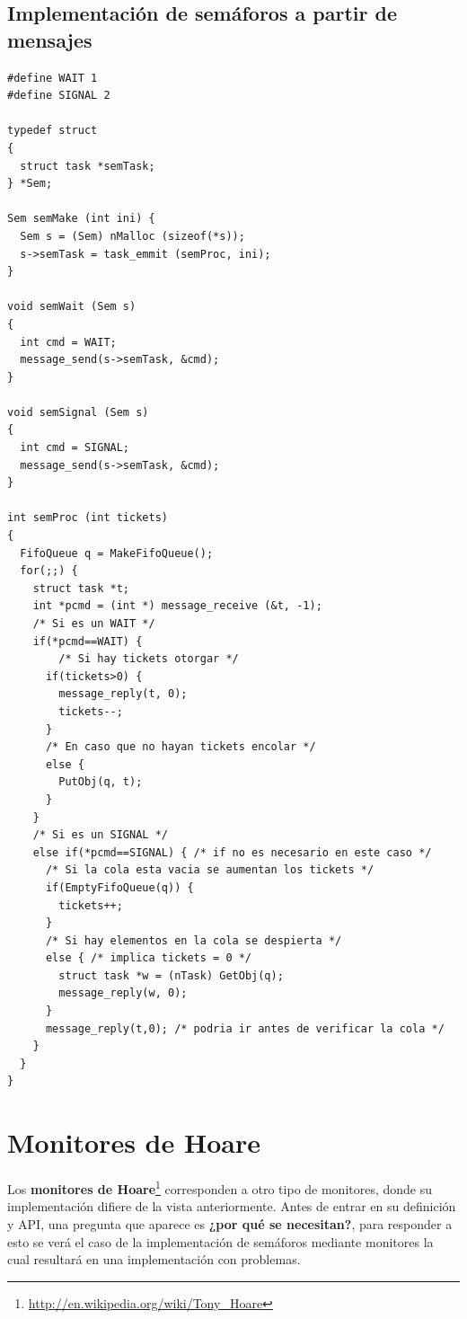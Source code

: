 \subsection{Implementación de semáforos a partir de mensajes}

\begin{lstlisting}
#define WAIT 1
#define SIGNAL 2

typedef struct
{
  struct task *semTask;
} *Sem;

Sem semMake (int ini) {
  Sem s = (Sem) nMalloc (sizeof(*s));
  s->semTask = task_emmit (semProc, ini);
}

void semWait (Sem s)
{
  int cmd = WAIT;
  message_send(s->semTask, &cmd);
}

void semSignal (Sem s)
{
  int cmd = SIGNAL;
  message_send(s->semTask, &cmd);
}

int semProc (int tickets)
{
  FifoQueue q = MakeFifoQueue();
  for(;;) {
    struct task *t;
    int *pcmd = (int *) message_receive (&t, -1);
    /* Si es un WAIT */
    if(*pcmd==WAIT) {
    	/* Si hay tickets otorgar */
      if(tickets>0) {
        message_reply(t, 0);
        tickets--;
      }
      /* En caso que no hayan tickets encolar */
      else {
        PutObj(q, t);
      }
    }
    /* Si es un SIGNAL */
    else if(*pcmd==SIGNAL) { /* if no es necesario en este caso */
      /* Si la cola esta vacia se aumentan los tickets */
      if(EmptyFifoQueue(q)) {
        tickets++;
      }
      /* Si hay elementos en la cola se despierta */
      else { /* implica tickets = 0 */
        struct task *w = (nTask) GetObj(q);
        message_reply(w, 0);
      }
      message_reply(t,0); /* podria ir antes de verificar la cola */
    }
  }
}
\end{lstlisting}

\section{Monitores de Hoare}

Los \textbf{monitores de
Hoare}\footnote{\url{http://en.wikipedia.org/wiki/Tony_Hoare}} corresponden a
otro tipo de monitores, donde su implementación difiere de la vista
anteriormente. Antes de entrar en su definición y API, una pregunta que aparece
es \textbf{¿por qué se necesitan?}, para responder a esto se verá el caso de la
implementación de semáforos mediante monitores la cual resultará en una
implementación con problemas.

